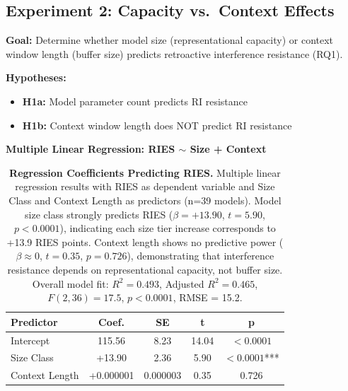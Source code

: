 \documentclass{article}
\begin{document}
\subsection{Experiment 2: Capacity vs.\ Context Effects}
\label{exp:capacity}

\textbf{Goal:} Determine whether model size (representational capacity) or context window length (buffer size) predicts retroactive interference resistance (RQ1).

\textbf{Hypotheses:}
\begin{itemize}[itemsep=2pt,topsep=3pt,parsep=0pt]
    \item \textbf{H1a:} Model parameter count predicts RI resistance
    \item \textbf{H1b:} Context window length does NOT predict RI resistance
\end{itemize}

\textbf{Multiple Linear Regression: RIES $\sim$ Size + Context}

\begin{table}[t]
\centering
\small
\caption{\textbf{Regression Coefficients Predicting RIES.}
Multiple linear regression results with RIES as dependent variable and Size Class and Context Length as predictors (n=39 models).
Model size class strongly predicts RIES ($\beta = +13.90$, $t = 5.90$, $p < 0.0001$), indicating each size tier increase corresponds to +13.9 RIES points.
Context length shows no predictive power ($\beta \approx 0$, $t = 0.35$, $p = 0.726$), demonstrating that interference resistance depends on representational capacity, not buffer size.
Overall model fit: $R^2 = 0.493$, Adjusted $R^2 = 0.465$, $F(2, 36) = 17.5$, $p < 0.0001$, RMSE = 15.2.}
\setlength{\tabcolsep}{4pt}
\begin{tabular}{@{}lcccc@{}}
\toprule
Predictor & Coef. & SE & t & p \\
\midrule
Intercept & 115.56 & 8.23 & 14.04 & $< 0.0001$ \\
Size Class & +13.90 & 2.36 & 5.90 & $< 0.0001$*** \\
Context Length & +0.000001 & 0.000003 & 0.35 & 0.726 \\
\bottomrule
\end{tabular}
\end{table}
\end{document}
